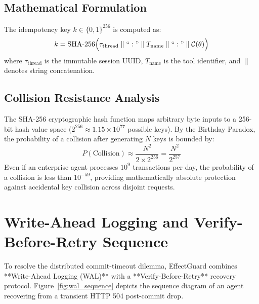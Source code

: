 \subsection{Mathematical Formulation}
The idempotency key $k \in \{0, 1\}^{256}$ is computed as:
\begin{equation}
    k = \text{SHA-256}\Big(\tau_{\text{thread}} \parallel ``:" \parallel T_{\text{name}} \parallel ``:" \parallel \mathcal{C}(\theta)\Big)
\end{equation}
where $\tau_{\text{thread}}$ is the immutable session UUID, $T_{\text{name}}$ is the tool identifier, and $\parallel$ denotes string concatenation.

\subsection{Collision Resistance Analysis}
The SHA-256 cryptographic hash function maps arbitrary byte inputs to a 256-bit hash value space ($2^{256} \approx 1.15 \times 10^{77}$ possible keys). By the Birthday Paradox, the probability of a collision after generating $N$ keys is bounded by:
\begin{equation}
    P(\text{Collision}) \approx \frac{N^2}{2 \times 2^{256}} = \frac{N^2}{2^{257}}
\end{equation}
Even if an enterprise agent processes $10^9$ transactions per day, the probability of a collision is less than $10^{-59}$, providing mathematically absolute protection against accidental key collision across disjoint requests.

\section{Write-Ahead Logging and Verify-Before-Retry Sequence}
\label{sec:design_wal}
To resolve the distributed commit-timeout dilemma, EffectGuard combines **Write-Ahead Logging (WAL)** with a **Verify-Before-Retry** recovery protocol. Figure~\ref{fig:wal_sequence} depicts the sequence diagram of an agent recovering from a transient HTTP 504 post-commit drop.

